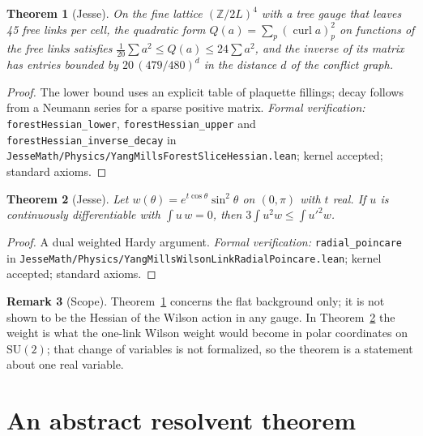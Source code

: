\documentclass[11pt]{article}
\numberwithin{equation}{subsection}
\theoremstyle{plain}
\newtheorem{theorem}{Theorem}[subsection]
\theoremstyle{definition}
\newtheorem{remark}[theorem]{Remark}
\newcommand{\Z}{\mathbb{Z}}
\newcommand{\SU}{\mathrm{SU}}
\begin{document}
\begin{theorem}[Jesse]\label{thm:forest}
On the fine lattice $(\Z/2L)^4$ with a tree gauge that leaves 45 free links per cell, the
quadratic form $Q(a)=\sum_p(\operatorname{curl}a)_p^2$ on functions of the free links satisfies
$\frac1{20}\sum a^2\le Q(a)\le 24\sum a^2$, and the inverse of its matrix has entries bounded by
$20\,(479/480)^{d}$ in the distance $d$ of the conflict graph.
\end{theorem}
\begin{proof}
The lower bound uses an explicit table of plaquette fillings; decay follows from a Neumann
series for a sparse positive matrix. \emph{Formal verification:} \texttt{forest\allowbreak{}Hessian\_\allowbreak{}lower},
\texttt{forest\allowbreak{}Hessian\_\allowbreak{}upper} and \texttt{forest\allowbreak{}Hessian\_\allowbreak{}inverse\_\allowbreak{}decay} in
\texttt{Jesse\allowbreak{}Math/\allowbreak{}Physics/\allowbreak{}Yang\allowbreak{}Mills\allowbreak{}Forest\allowbreak{}Slice\allowbreak{}Hessian.\allowbreak{}lean}; kernel accepted; standard axioms.
\end{proof}

\begin{theorem}[Jesse]\label{thm:radial}
Let $w(\theta)=e^{t\cos\theta}\sin^2\theta$ on $(0,\pi)$ with $t$ real. If $u$ is continuously
differentiable with $\int u\,w=0$, then $3\int u^2w\le\int u'^2w$.
\end{theorem}
\begin{proof}
A dual weighted Hardy argument. \emph{Formal verification:} \texttt{radial\_\allowbreak{}poincare} in
\texttt{Jesse\allowbreak{}Math/\allowbreak{}Physics/\allowbreak{}Yang\allowbreak{}Mills\allowbreak{}Wilson\allowbreak{}Link\allowbreak{}Radial\allowbreak{}Poincare.\allowbreak{}lean}; kernel accepted; standard axioms.
\end{proof}

\begin{remark}[Scope]
Theorem~\ref{thm:forest} concerns the flat background only; it is not shown to be the Hessian
of the Wilson action in any gauge. In Theorem~\ref{thm:radial} the weight is what the one-link
Wilson weight would become in polar coordinates on $\SU(2)$; that change of variables is not
formalized, so the theorem is a statement about one real variable.
\end{remark}

\section{An abstract resolvent theorem}\label{sec:resolvent}
\end{document}
